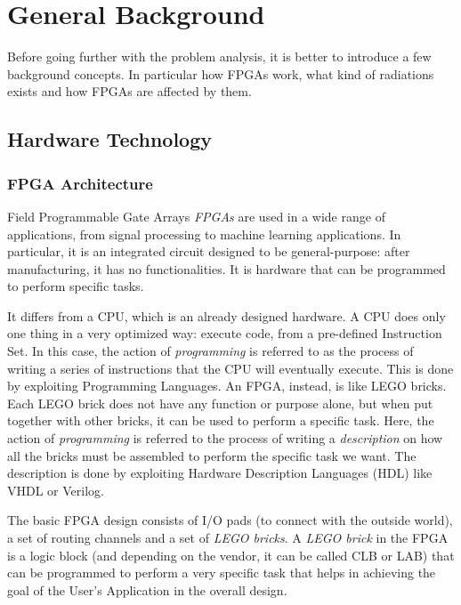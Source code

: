 \nocite{doi:10.1063/1.5127719}
\nocite{STERPONE20152087}
\nocite{1545891}
\nocite{7948546}
\nocite{8093203}
\nocite{ecss1}
\nocite{nasa2}

\chapter{General Background}
\label{sec:background}

Before going further with the problem analysis, it is better to introduce a few background concepts. In particular how FPGAs work, what kind of radiations exists and how FPGAs are affected by them.  

\section{Hardware Technology}

\subsection{FPGA Architecture}
\label{sec:fpgaarchitecture}
Field Programmable Gate Arrays \textit{FPGAs} are used in a wide range of applications, from signal processing to machine learning applications. In particular, it is an integrated circuit designed to be general-purpose: after manufacturing, it has no functionalities. It is hardware that can be programmed to perform specific tasks. \bigskip

It differs from a CPU, which is an already designed hardware. A CPU does only one thing in a very optimized way: execute code, from a pre-defined Instruction Set. In this case, the action of \textit{programming} is referred to as the process of writing a series of instructions that the CPU will eventually execute. This is done by exploiting Programming Languages. An FPGA, instead, is like LEGO bricks. Each LEGO brick does not have any function or purpose alone, but when put together with other bricks, it can be used to perform a specific task. Here, the action of \textit{programming} is referred to the process of writing a \textit{description} on how all the bricks must be assembled to perform the specific task we want. The description is done by exploiting Hardware Description Languages (HDL) like VHDL or Verilog. \bigskip

The basic FPGA design consists of I/O pads (to connect with the outside world), a set of routing channels and a set of \textit{LEGO bricks}. A \textit{LEGO brick} in the FPGA is a logic block (and depending on the vendor, it can be called CLB or LAB) that can be programmed to perform a very specific task that helps in achieving the goal of the User's Application in the overall design. 

